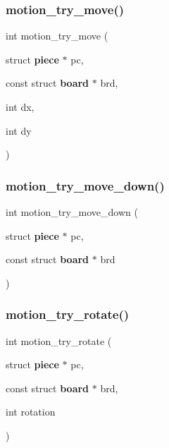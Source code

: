 \mbox{\label{motion_8c_a29682f9162cac571bd205e47492c5ab8}} 
\subsubsection{motion\+\_\+try\+\_\+move()}
{\footnotesize\ttfamily int motion\+\_\+try\+\_\+move (\begin{DoxyParamCaption}\item[{struct \textbf{ piece} $\ast$}]{pc,  }\item[{const struct \textbf{ board} $\ast$}]{brd,  }\item[{int}]{dx,  }\item[{int}]{dy }\end{DoxyParamCaption})}

\mbox{\label{motion_8c_a416d5d5b14ef78b17dd4f892627556ac}} 
\subsubsection{motion\+\_\+try\+\_\+move\+\_\+down()}
{\footnotesize\ttfamily int motion\+\_\+try\+\_\+move\+\_\+down (\begin{DoxyParamCaption}\item[{struct \textbf{ piece} $\ast$}]{pc,  }\item[{const struct \textbf{ board} $\ast$}]{brd }\end{DoxyParamCaption})}

\mbox{\label{motion_8c_a249827f1bf1b0101949ba0818d13d8f5}} 
\subsubsection{motion\+\_\+try\+\_\+rotate()}
{\footnotesize\ttfamily int motion\+\_\+try\+\_\+rotate (\begin{DoxyParamCaption}\item[{struct \textbf{ piece} $\ast$}]{pc,  }\item[{const struct \textbf{ board} $\ast$}]{brd,  }\item[{int}]{rotation }\end{DoxyParamCaption})}

